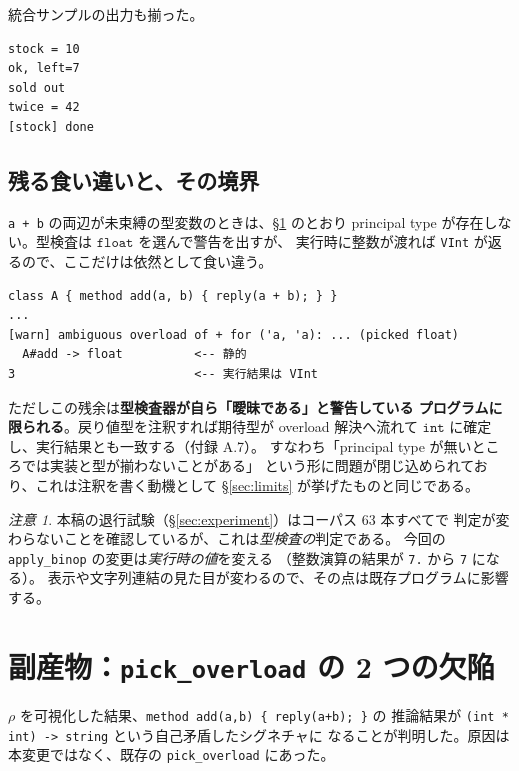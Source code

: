 \documentclass[11pt,a4paper]{ltjsarticle}
\theoremstyle{definition}
\theoremstyle{remark}
\newtheorem{remark}{注意}
\newcommand{\ty}[1]{\ensuremath{\mathtt{#1}}}
\begin{document}
統合サンプルの出力も揃った。

\begin{lstlisting}[language={}]
stock = 10
ok, left=7
sold out
twice = 42
[stock] done
\end{lstlisting}

\subsection{残る食い違いと、その境界}

\texttt{a + b} の両辺が未束縛の型変数のときは、\S\ref{sec:overload} のとおり
principal type が存在しない。型検査は \ty{float} を選んで警告を出すが、
実行時に整数が渡れば \texttt{VInt} が返るので、ここだけは依然として食い違う。

\begin{lstlisting}[language={}]
class A { method add(a, b) { reply(a + b); } }
...
[warn] ambiguous overload of + for ('a, 'a): ... (picked float)
  A#add -> float          <-- 静的
3                         <-- 実行結果は VInt
\end{lstlisting}

ただしこの残余は\textbf{型検査器が自ら「曖昧である」と警告している
プログラムに限られる}。戻り値型を注釈すれば期待型が overload 解決へ流れて
\ty{int} に確定し、実行結果とも一致する（付録 A.7）。
すなわち「principal type が無いところでは実装と型が揃わないことがある」
という形に問題が閉じ込められており、これは注釈を書く動機として
\S\ref{sec:limits} が挙げたものと同じである。

\begin{remark}
本稿の退行試験（\S\ref{sec:experiment}）はコーパス 63 本すべてで
判定が変わらないことを確認しているが、これは\emph{型検査の}判定である。
今回の \texttt{apply\_binop} の変更は\emph{実行時の値}を変える
（整数演算の結果が \texttt{7.} から \texttt{7} になる）。
表示や文字列連結の見た目が変わるので、その点は既存プログラムに影響する。
\end{remark}

\section{副産物：\texttt{pick\_overload} の 2 つの欠陥}
\label{sec:overload}

$\rho$ を可視化した結果、\texttt{method add(a,b) \{ reply(a+b); \}} の
推論結果が \texttt{(int * int) -> string} という自己矛盾したシグネチャに
なることが判明した。原因は本変更ではなく、既存の
\texttt{pick\_overload} にあった。
\end{document}
